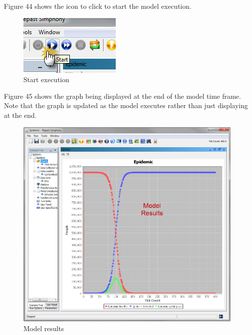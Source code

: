 \documentclass[11pt]{amsart}
\begin{document}
Figure 44 shows the icon to click to start the model execution.


\begin{figure}[ht]
\begin{center}
\vspace{.2in}
\centerline {
\includegraphics[totalheight=0.3\textheight]{images/042.jpg}
}
\caption{Start execution}
\label{fig:042}
\end{center}
\end{figure}

Figure 45 shows the graph being displayed at the end of the model time frame. Note that the graph is updated as the model executes rather than just displaying at the end.


\begin{figure}[ht]
\begin{center}
\vspace{.2in}
\centerline {
\includegraphics[totalheight=0.5\textheight]{images/043.jpg}
}
\caption{Model results}
\label{fig:043}
\end{center}
\end{figure}
\end{document}
